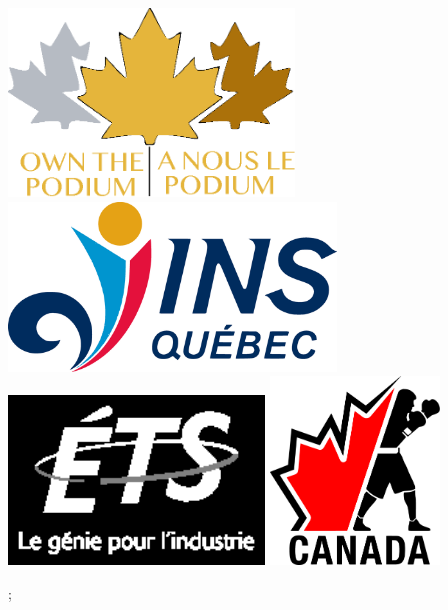 \documentclass[900pt, a0paper, landscape]{tikzposter}
\begin{document}
{\begin{minipage}[c][][c]{\linewidth}
    \centering
    \includegraphics[height=5cm]{figures/podium.eps}
    \hspace*{40pt}
    \includegraphics[height=4.5cm]{figures/ins.eps}
    \hspace*{40pt} 
    \includegraphics[height=4.5cm]{figures/ets.eps}
    \hspace*{40pt}
    \includegraphics[height=5cm]{figures/boxing.eps}
\end{minipage}

};
\end{document}
